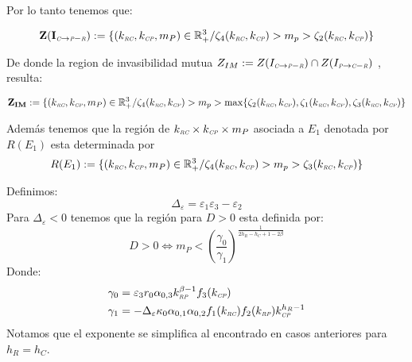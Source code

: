 Por lo tanto tenemos que:

\begin{equation}
\mathbf{Z(I_{\textit{\tiny C} \to \textit{\tiny P}-\textit{\tiny R}})} := \{ (k_{\textit{\tiny RC}},k_{\textit{\tiny CP}},m_P) \in \mathbb{R}^3_+ / \zeta_4(k_{\textit{\tiny RC}},k_{\textit{\tiny CP}}) > m_p > \zeta_2(k_{\textit{\tiny RC}},k_{\textit{\tiny CP}}) \}
\end{equation}

De donde la region de invasibilidad mutua $Z_{IM} := Z(I_{\textit{\tiny C} \to \textit{\tiny P}-\textit{\tiny R}}) \cap Z(I_{\textit{\tiny P} \to \textit{\tiny C}-\textit{\tiny R}})$ , resulta:


\begin{equation}
\mathbf{Z_{IM}} := \{ (k_{\textit{\tiny RC}},k_{\textit{\tiny CP}},m_P) \in \mathbb{R}^3_+ / \zeta_4(k_{\textit{\tiny RC}},k_{\textit{\tiny CP}}) > m_p > \max \{ \zeta_2(k_{\textit{\tiny RC}},k_{\textit{\tiny CP}}) , \zeta_1(k_{\textit{\tiny RC}},k_{\textit{\tiny CP}}) , \zeta_3(k_{\textit{\tiny RC}},k_{\textit{\tiny CP}}) \}
\end{equation}

Adem\'as tenemos que la regi\'on de $k_{\textit{\tiny RC}} \times k_{\textit{\tiny CP}} \times m_P$ asociada a $E_1$ denotada por $R(E_1)$ esta determinada por
\begin{equation}
  R(E_1) := \{ (k_{\textit{\tiny RC}},k_{\textit{\tiny CP}},m_P) \in \mathbb{R}^3_+ / \zeta_4(k_{\textit{\tiny RC}},k_{\textit{\tiny CP}}) > m_p > \zeta_3(k_{\textit{\tiny RC}},k_{\textit{\tiny CP}}) \}
\end{equation}

Definimos:
\begin{equation}
  \Delta_\varepsilon = \varepsilon_1 \varepsilon_3 - \varepsilon_2
\end{equation}
Para $\Delta_\varepsilon <0$ tenemos que la regi\'on para $D >0$ esta definida por:
\begin{equation}
    D >0  \iff  m_P < (\frac{\gamma_0}{\gamma_1})^{\frac{1}{2h_R - h_C + 1 - 2 \beta}}
\end{equation}
Donde:
\begin{equation}
  \begin{aligned}
    \gamma_ 0 &= \varepsilon_3 r_0\alpha_{0,3}k_{\textit{\tiny RP}}^{\beta-1}f_3(k_{\textit{\tiny CP}})\\
    \gamma_1 &= -\Delta_\varepsilon \kappa_0 \alpha_{0,1}\alpha_{0,2}f_1(k_{\textit{\tiny RC}})f_2(k_{\textit{\tiny RP}}) k_{\textit{\tiny CP}}^{h_R - 1}    
  \end{aligned}
\end{equation}
Notamos que el exponente se simplifica al encontrado en casos anteriores para $h_R  = h_C$.



